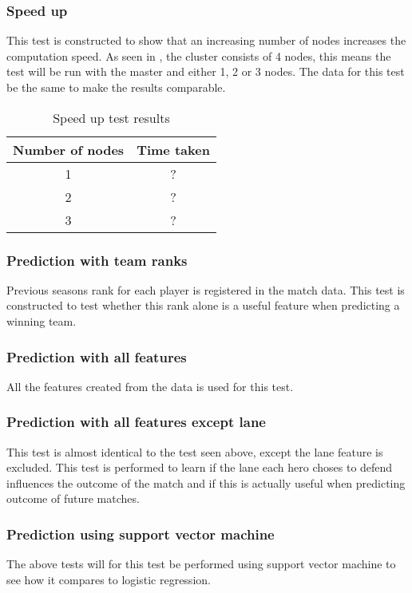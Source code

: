 \subsubsection{Speed up}
This test is constructed to show that an increasing number of nodes increases the computation speed. As seen in , the cluster consists of 4 nodes, this means the test will be run with the master and either 1, 2 or 3 nodes. The data for this test be the same to make the results comparable.

\begin{table}[!htb]
  \centering
  \begin{tabular}{|c|c|}
    \hline
    Number of nodes & Time taken\\
    \hline
    1 & ? \\
    2 & ? \\
    3 & ? \\
    \hline
  \end{tabular}
  \caption{Speed up test results}\label{tab:speedup}
\end{table}

\subsubsection{Prediction with team ranks}
Previous seasons rank for each player is registered in the match data. This test is constructed to test whether this rank alone is a useful feature when predicting a winning team.
\subsubsection{Prediction with all features}
All the features created from the data is used for this test. 
\subsubsection{Prediction with all features except lane}
This test is almost identical to the test seen above, except the lane feature is excluded. This test is performed to learn if the lane each hero choses to defend influences the outcome of the match and if this is actually useful when predicting outcome of future matches.
\subsubsection{Prediction using support vector machine}
The above tests will for this test be performed using support vector machine to see how it compares to logistic regression. 
